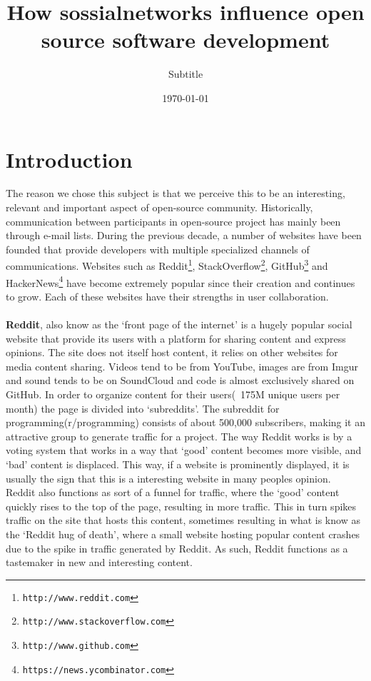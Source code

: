 \documentclass[a4paper,11pt]{scrartcl}
\title{How sossialnetworks influence open source software development}
\subtitle{Subtitle}
\date{\today}
\begin{document}
\maketitle

\section{Introduction}

The reason we chose this subject is that we perceive this to be an interesting, relevant and important aspect of open-source community. Historically, communication between participants in open-source project has mainly been through e-mail lists. During the previous decade, a number of websites have been founded that provide developers with multiple specialized channels of communications. Websites such as  Reddit\footnote{\texttt{http://www.reddit.com}}, StackOverflow\footnote{\texttt{http://www.stackoverflow.com}}, GitHub\footnote{\texttt{http://www.github.com}} and HackerNews\footnote{\texttt{https://news.ycombinator.com}} have become extremely popular since their creation and continues to grow. Each of these websites have their strengths in user collaboration. 
\\\\
\textbf{Reddit}, also know as the ‘front page of the internet’ is a hugely popular social website that provide its users with a platform for sharing content and express opinions. The site does not itself host content, it relies on other websites for media content sharing. Videos tend to be from YouTube, images are from Imgur and sound tends to be on SoundCloud and code is almost exclusively shared on GitHub. In order to organize content for their users(~175M unique users per month) the page is divided into ‘subreddits’. The subreddit for programming(r/programming) consists of about 500,000 subscribers, making it an attractive group to generate traffic for a project. The way Reddit works is by a voting system that works in a way that ‘good’ content becomes more visible, and ‘bad’ content is displaced. This way, if a website is prominently displayed, it is usually the sign that this is a interesting website in many peoples opinion.
\\
Reddit also functions as sort of a funnel for traffic, where the ‘good’ content quickly rises to the top of the page, resulting in more traffic. This in turn spikes traffic on the site that hosts this content, sometimes resulting in what is know as the ‘Reddit hug of death’, where a small website hosting popular content crashes due to the spike in traffic generated by Reddit. As such, Reddit functions as a tastemaker in new and interesting content. 
\end{document}
